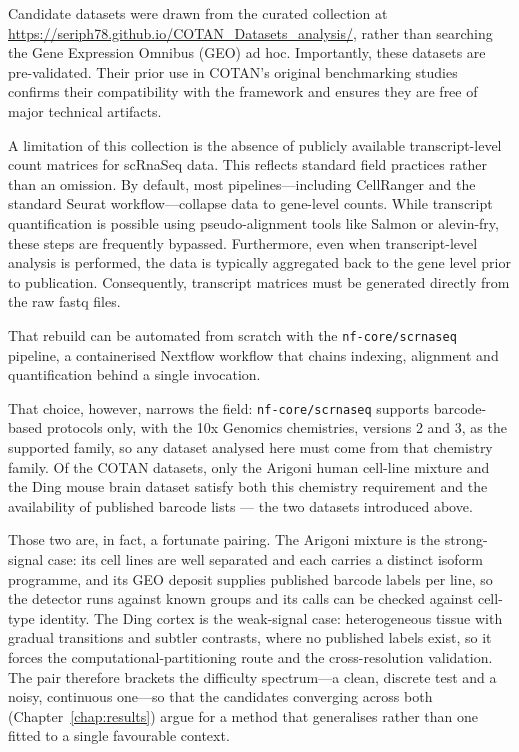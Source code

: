 Candidate datasets were drawn from the curated collection at \url{https://seriph78.github.io/COTAN_Datasets_analysis/}, rather than searching the Gene Expression Omnibus (GEO)\cite{barrett2013geo} ad hoc. Importantly, these datasets are pre-validated. Their prior use in COTAN's original benchmarking studies confirms their compatibility with the framework and ensures they are free of major technical artifacts.

A limitation of this collection is the absence of publicly available transcript-level count matrices for \gls{scRnaSeq} data. This reflects standard field practices rather than an omission. By default, most pipelines---including CellRanger\cite{zheng2017massively} and the standard Seurat workflow\cite{hao2024seurat}---collapse data to \gls{gene}-level counts. While transcript quantification is possible using pseudo-alignment tools like Salmon\cite{patro2017salmon} or alevin-fry\cite{he2022alevin}, these steps are frequently bypassed. Furthermore, even when transcript-level analysis is performed, the data is typically aggregated back to the gene level prior to publication. Consequently, transcript matrices must be generated directly from the raw \gls{fastq} files.

That rebuild can be automated from scratch with the \texttt{nf-core/scrnaseq} pipeline\cite{ewels2020nfcore}, a containerised Nextflow workflow that chains indexing, alignment and quantification behind a single invocation.

That choice, however, narrows the field: \texttt{nf-core/scrnaseq} supports barcode-based protocols only, with the 10x Genomics\cite{zheng2017massively} chemistries, versions 2 and 3, as the supported family, so any dataset analysed here must come from that chemistry family. Of the COTAN datasets, only the Arigoni human cell-line mixture and the Ding mouse brain dataset satisfy both this chemistry requirement and the availability of published barcode lists --- the two datasets introduced above.

Those two are, in fact, a fortunate pairing. The Arigoni mixture is the strong-signal case: its cell lines are well separated and each carries a distinct isoform programme, and its GEO deposit supplies published barcode labels per line, so the detector runs against known groups and its calls can be checked against cell-type identity. The Ding cortex is the weak-signal case: heterogeneous tissue with gradual transitions and subtler contrasts, where no published labels exist, so it forces the computational-partitioning route and the cross-resolution validation. The pair therefore brackets the difficulty spectrum---a clean, discrete test and a noisy, continuous one---so that the candidates converging across both (Chapter~\ref{chap:results}) argue for a method that generalises rather than one fitted to a single favourable context.

